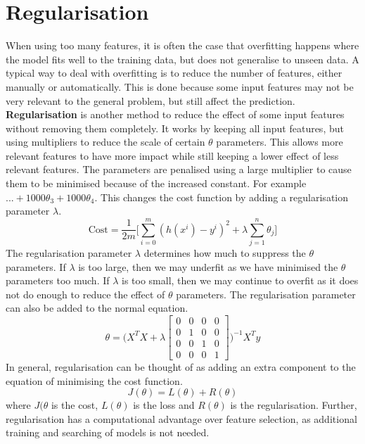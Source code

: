 \documentclass[CS5104-Notes.tex]{subfiles}
\begin{document}
\section{Regularisation}
When using too many features, it is often the case that overfitting happens where the model fits well to the training data, but does not generalise to unseen data. A typical way to deal with overfitting is to reduce the number of features, either manually or automatically. This is done because some input features may not be very relevant to the general problem, but still affect the prediction. 
\n
\textbf{Regularisation} is another method to reduce the effect of some input features without removing them completely. It works by keeping all input features, but using multipliers to reduce the scale of certain $\theta$ parameters. This allows more relevant features to have more impact while still keeping a lower effect of less relevant features. The parameters are penalised using a large multiplier to cause them to be minimised because of the increased constant. For example $... + 1000\theta_{3} + 1000\theta_{4}$. This changes the cost function by adding a regularisation parameter $\lambda$.
\begin{equation}
\text{Cost} = \frac{1}{2m}\bigg[\sum_{i=0}^{m}(h(x^{i}) - y^{i})^{2} + \lambda \sum_{j=1}^{n}\theta_{j} \bigg]
\end{equation}
The regularisation parameter $\lambda$ determines how much to suppress the $\theta$ parameters. If $\lambda$ is too large, then we may underfit as we have minimised the $\theta$ parameters too much. If $\lambda$ is too small, then we may continue to overfit as it does not do enough to reduce the effect of $\theta$ parameters. 
\n
The regularisation parameter can also be added to the normal equation.
\begin{equation}
\theta = \Bigg( X^{T}X + \lambda \begin{bmatrix} 
	0 & 0 & 0 & 0 \\
	0 & 1 & 0 & 0 \\
	0 & 0 & 1 & 0 \\
	0 & 0 & 0 & 1
\end{bmatrix}  \Bigg)^{-1}X^{T}y
\end{equation}
In general, regularisation can be thought of as adding an extra component to the equation of minimising the cost function.
\begin{equation}
J(\theta) = L(\theta) + R(\theta)
\end{equation}
where $J(\theta$ is the cost, $L(\theta)$ is the loss and $R(\theta)$ is the regularisation. Further, regularisation has a computational advantage over feature selection, as additional training and searching of models is not needed.
\end{document}
